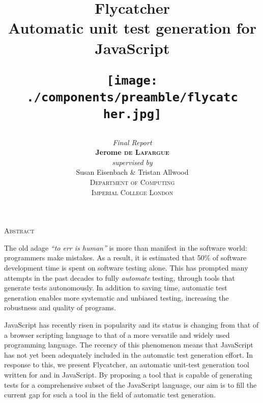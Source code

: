 \title
{
	{\Huge \textsf{Flycatcher} \\[0.2cm]}
	{\large \textsf{Automatic unit test generation for JavaScript}\\[0.5cm]}
	\begin{figure}[h]
		\centering
		\texttt{[image: ./components/preamble/flycatcher.jpg]}
	\end{figure}
}
\author
{	
	{\emph{Final Report}}\\[6.5cm]
	{\large \textbf{Jerome \textsc{de Lafargue}}}\\[0.2cm]
	\emph{supervised by}\\
	Susan Eisenbach \& Tristan Allwood\\[1cm]
	\textsc{\normalsize Department of Computing}\\
	\textsc{\large Imperial College London}
}


\date{}
\pagestyle{empty}
\maketitle


\newpage
\mbox{}

\begin{center}
\textsc{\LARGE Abstract}\\[1.4cm]
\end{center}

The old adage \emph{``to err is human''} is more than manifest in the software world: programmers make mistakes. As a result, it is estimated that 50\% of software development time is spent on software testing alone. This has prompted many attempts in the past decades to fully \emph{automate} testing, through tools that generate tests autonomously. In addition to saving time, automatic test generation enables more systematic and unbiased testing, increasing the robustness and quality of programs.

JavaScript has recently risen in popularity and its status is changing from that of a browser scripting language to that of a more versatile and widely used programming language. The recency of this phenomenon means that JavaScript has not yet been adequately included in the automatic test generation effort. In response to this, we present \textsf{Flycatcher}, an automatic unit-test generation tool written for and in JavaScript. By proposing a tool that is capable of generating tests for a comprehensive subset of the JavaScript language, our aim is to fill the current gap for such a tool in the field of automatic test generation.

